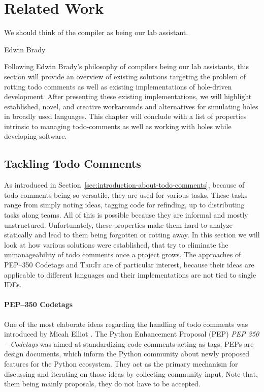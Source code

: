 \chapter{Related Work}
\label{cha:related-work}
\epigraph{We should think of the compiler as being our lab assistant.}{Edwin Brady}

Following Edwin Brady's philosophy of compilers being our lab assistants, this section will provide an overview of existing solutions targeting the problem of rotting todo comments as well as existing implementations of hole-driven development.
After presenting these existing implementations, we will highlight established, novel, and creative workarounds and alternatives for simulating holes in broadly used languages.
This chapter will conclude with a list of properties intrinsic to managing todo-comments as well as working with holes while developing software.

\section{Tackling Todo Comments}
\label{sec:tackling-todo-comments}
As introduced in Section~\ref{sec:introduction-about-todo-comments}, because of todo comments being so versatile, they are used for various tasks.
These tasks range from simply noting ideas, tagging code for refinding, up to distributing tasks along teams.
All of this is possible because they are informal and mostly unstructured.
Unfortunately, these properties make them hard to analyze statically and lead to them being forgotten or rotting away.
In this section we will look at how various solutions were established, that try to eliminate the unmanageability of todo comments once a project grows.
The approaches of PEP--350 Codetags and \textsc{TrigIt} are of particular interest, because their ideas are applicable to different languages and their implementations are not tied to single IDEs.

\subsubsection{PEP--350 Codetags}
\label{sec:codetags}
One of the most elaborate ideas regarding the handling of todo comments was introduced by Micah Elliot \cite{elliott_pep_2005}.
The Python Enhancement Proposal (PEP) \emph{PEP 350 -- Codetags} was aimed at standardizing code comments acting as tags.
PEPs are design documents, which inform the Python community about newly proposed features for the Python ecosystem.
They act as the primary mechanism for discussing and iterating on those ideas by collecting community input.
Note that, them being mainly proposals, they do not have to be accepted.

